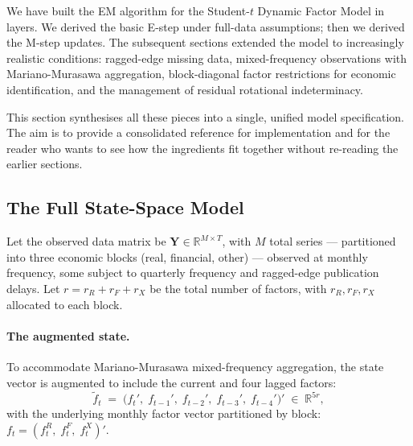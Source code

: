 \documentclass[11pt, a4paper, oneside]{article}
\begin{document}
We have built the EM algorithm for the Student-$t$ Dynamic Factor
Model in layers. We derived the basic E-step
under full-data assumptions; then we derived the
M-step updates. The subsequent sections extended the model to
increasingly realistic conditions: ragged-edge missing data, mixed-frequency observations with
Mariano-Murasawa aggregation,
block-diagonal factor restrictions for economic identification, and the management of residual
rotational indeterminacy.

This section synthesises all these pieces into a single, unified
model specification. The aim is to provide a consolidated reference
for implementation and for the reader who wants to see how the
ingredients fit together without re-reading the earlier sections.

\subsection{The Full State-Space Model}
\label{subsec:full-ssm}

Let the observed data matrix be $\mathbf{Y} \in \mathbb{R}^{M \times T}$,
with $M$ total series — partitioned into three economic blocks (real,
financial, other) — observed at monthly frequency, some subject to
quarterly frequency and ragged-edge publication delays. Let
$r = r_R + r_F + r_X$ be the total number of factors, with $r_R, r_F, r_X$
allocated to each block.

\paragraph{The augmented state.}
To accommodate Mariano-Murasawa mixed-frequency aggregation, the state
vector is augmented to include the current and four lagged factors:
\[
\tilde{f}_t \;=\; \big(f_t',\; f_{t-1}',\; f_{t-2}',\; f_{t-3}',\; f_{t-4}'\big)' \;\in\; \mathbb{R}^{5r},
\]
with the underlying monthly factor vector partitioned by block:
$f_t = (f^R_t,\; f^F_t,\; f^X_t)'$.
\end{document}
